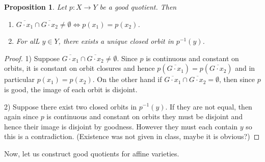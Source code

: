 \documentclass{article}
\newtheorem{prop}[theorem]{Proposition}
\theoremstyle{definition}
\theoremstyle{remark}
\numberwithin{theorem}{section}
\begin{document}
\begin{prop}
	Let $p:X\to Y$ be a good quotient. Then 
	\begin{enumerate}
		\item $\overline{G\cdot x_1} \cap \overline{G\cdot x_2} \neq \emptyset \iff  p(x_1)=p(x_2)$.
		\item For alL $y\in Y$, there exists a unique closed orbit in $p^{-1}(y)$.
	\end{enumerate}
\end{prop}
\begin{proof}
	1) Suppose $\overline{G\cdot x_1} \cap \overline{G\cdot x_2} \neq \emptyset$. Since $p$ is continuous and constant on orbits, it is constant on orbit closures and hence $p(\overline{G\cdot x_1}) = p(\overline{G\cdot x_2})$ and in particular $p(x_1)=p(x_2)$. On the other hand if $\overline{G\cdot x_1} \cap \overline{G\cdot x_2} = \emptyset$, then since $p$ is good, the image of each orbit is disjoint. \vspace{1em}
	
	2) Suppose there exist two closed orbits in $p^{-1}(y)$. If they are not equal, then again since $p$ is continuous and constant on orbits they must be disjoint and hence their image is disjoint by goodness. However they must each contain $y$ so this is a contradiction. (Existence was not given in class, maybe it is obvious?)
\end{proof}
Now, let us construct good quotients for affine varieties.

\pagebreak
\end{document}
